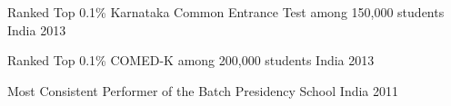 \begin{cvhonors}
  \cvhonor
    {Ranked Top 0.1\%} %
    {Karnataka Common Entrance Test among 150,000 students} %
    {India} %
    {2013} %

  \cvhonor
    {Ranked Top 0.1\%} %
    {COMED-K among 200,000 students} %
    {India} %
    {2013} %
    
  \cvhonor
    {Most Consistent Performer of the Batch} %
    {Presidency School} %
    {India} %
    {2011} %
    \vspace{3mm}
\end{cvhonors}



